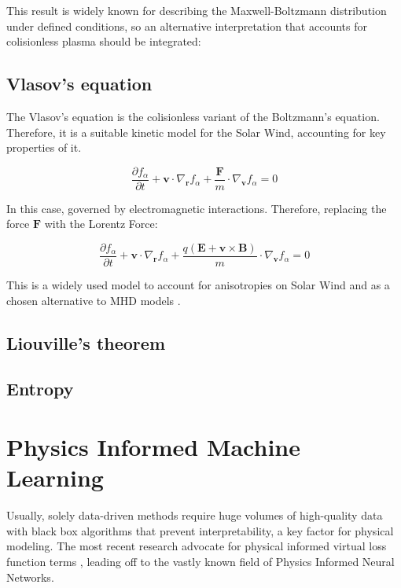 \documentclass[12pt]{article}
\begin{document}
This result is widely known for describing the Maxwell-Boltzmann distribution under defined conditions, so an alternative interpretation that accounts for colisionless plasma should be integrated:

\subsection{Vlasov's equation}
The Vlasov's equation is the colisionless variant of the Boltzmann's equation. Therefore, it is a  suitable kinetic model for the Solar Wind, accounting for key properties of it.

\begin{equation}
    \frac{\partial f_{\alpha}}{\partial t} + \mathbf{v} \cdot \nabla_{\mathbf{r}}  f_{\alpha} + \frac{\mathbf{F}}{m} \cdot \nabla_{\mathbf{v}} f_\alpha = 0
\end{equation}

In this case, governed by electromagnetic interactions. Therefore, replacing the force $\mathbf{F}$ with the Lorentz Force:

\begin{equation}
    \frac{\partial f_{\alpha}}{\partial t} + \mathbf{v} \cdot \nabla_{\mathbf{r}}  f_{\alpha} + \frac{q (\mathbf{E} + \mathbf{v} \times \mathbf{B})}{m} \cdot \nabla_{\mathbf{v}} f_\alpha = 0
\end{equation}

This is a widely used model to account for anisotropies on Solar Wind \cite{Verscharen_2016} and as a chosen alternative to MHD models \cite{grandin2023hybridvlasovsimulationsoftxray}.

\subsection{Liouville's theorem}

\subsection{Entropy}

\section{Physics Informed Machine Learning}
Usually, solely data-driven methods require huge volumes of high-quality data with black box algorithms that prevent interpretability, a key factor for physical modeling. The most recent research advocate for physical informed virtual loss function terms \cite{}, leading off to the vastly known field of Physics Informed Neural Networks.
\end{document}

